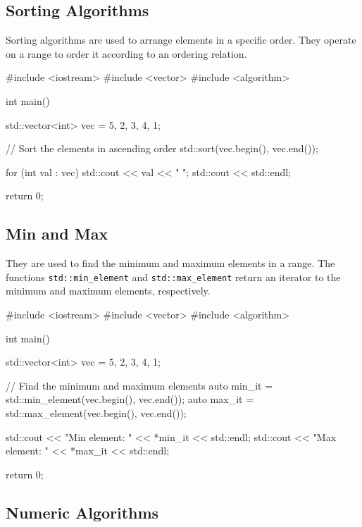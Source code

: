 \subsection{Sorting Algorithms}

Sorting algorithms are used to arrange elements in a specific order. They operate on a range to order it according to an ordering relation. 

\begin{exampleblock}
\begin{codeblock}[language=C++]
#include <iostream>
#include <vector>
#include <algorithm>

int main() {
    std::vector<int> vec = {5, 2, 3, 4, 1};

    // Sort the elements in ascending order
    std::sort(vec.begin(), vec.end());

    for (int val : vec) {
        std::cout << val << " ";
    }
    std::cout << std::endl;

    return 0;
}
\end{codeblock}
\end{exampleblock}

\subsection{Min and Max}

They are used to find the minimum and maximum elements in a range. The functions \texttt{std::min\_element} and \texttt{std::max\_element} return an iterator to the minimum and maximum elements, respectively.

\begin{exampleblock}
\begin{codeblock}[language=C++]
#include <iostream>
#include <vector>
#include <algorithm>

int main() {
    std::vector<int> vec = {5, 2, 3, 4, 1};

    // Find the minimum and maximum elements
    auto min_it = std::min_element(vec.begin(), vec.end());
    auto max_it = std::max_element(vec.begin(), vec.end());

    std::cout << "Min element: " << *min_it << std::endl;
    std::cout << "Max element: " << *max_it << std::endl;

    return 0;
}
\end{codeblock}
\end{exampleblock}

\subsection{Numeric Algorithms}

